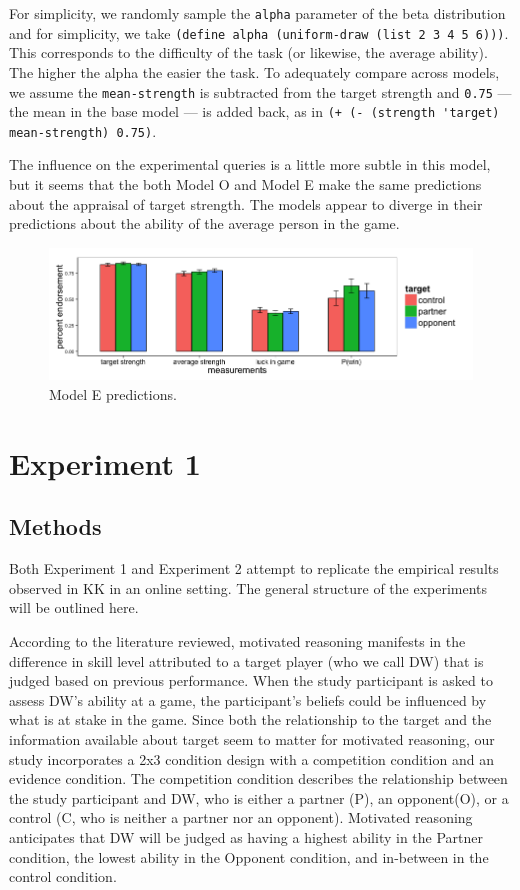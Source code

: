 \documentclass{article}
\begin{document}
For simplicity, we randomly sample the \lstinline{alpha} parameter of the beta distribution and for simplicity, we take
\lstinline{(define alpha (uniform-draw (list 2 3 4 5 6)))}. This corresponds to the difficulty of the task (or likewise, the average ability). The higher the alpha the easier the task. To adequately compare across models, we assume the \lstinline{mean-strength} is subtracted from the target strength and \lstinline{0.75} --- the mean in the base model --- is added back, as in \lstinline{(+ (- (strength 'target) mean-strength) 0.75)}.

The influence on the experimental queries is a little more subtle in this model, but it seems that the both Model O and Model E make the same predictions about the appraisal of target strength. The models appear to diverge in their predictions about the ability of the average person in the game.

\begin{figure}
\centering
    \includegraphics[width=\columnwidth]{modelE-predictions}
    \caption{Model E predictions.}
      \label{fig:modele}
\end{figure}


\section{Experiment 1}

\subsection{Methods}

Both Experiment 1 and Experiment 2 attempt to replicate the empirical results observed in KK in an online setting. The general structure of the experiments will be outlined here. 

According to the literature reviewed, motivated reasoning manifests in the difference in skill level attributed to a target player (who we call DW) that is judged based on previous performance. When the study participant is asked to assess DW's ability at a game, the participant's beliefs could be influenced by what is at stake in the game. Since both the relationship to the target and the information available about target seem to matter for motivated reasoning, our study incorporates a 2x3 condition design with a competition condition and an evidence condition. The competition condition describes the relationship between the study participant and DW, who is either a partner (P), an opponent(O), or a control (C, who is neither a partner nor an opponent). Motivated reasoning anticipates that DW will be judged as having a highest ability in the Partner condition, the lowest ability in the Opponent condition, and in-between in the control condition. 
\end{document}
